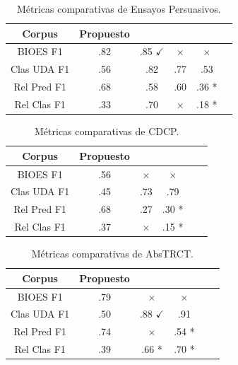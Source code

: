 \begin{table}[h!]
	\begin{center}
		\begin{tabular}{|c|c|c|c|c|c|} \hline
		Corpus		            & Propuesto  & \cite{stab2017parsing} & \cite{niculae2017argument} & \cite{galassi2021deep} \\ \hline
		BIOES F1 				& .82   	 & .85 $\checkmark$		  & $\times$        	       & $\times$				\\ \hline
		Clas UDA F1		        & .56	     & .82        			  & .77	    			       & .53					\\ \hline
		Rel Pred F1 			& .68   	 & .58        			  & .60			    	       & .36 *				   	\\ \hline
		Rel Clas F1 			& .33   	 & .70        			  & $\times$	    	       & .18 *				   	\\ \hline
		\end{tabular}
	\caption{Métricas comparativas de Ensayos Persuasivos.}\label{table:comparative_test_essays_f1_metrics_segmenter}
	\end{center}
\end{table}
\begin{table}[h!]
	\begin{center}
		\begin{tabular}{|c|c|c|c|c|c|} \hline
		Corpus		            & Propuesto  & \cite{niculae2017argument} & \cite{galassi2021deep}  \\ \hline
		BIOES F1 				& .56  	 	 & $\times$        	       	  & $\times$				\\ \hline
		Clas UDA F1		        & .45	     & .73 				 		  & .79					   	\\ \hline
		Rel Pred F1				& .68   	 & .27			    	      & .30	*			   	    \\ \hline
		Rel Clas F1				& .37   	 & $\times$	    	          & .15	*			   	    \\ \hline
		\end{tabular}
	\caption{Métricas comparativas de CDCP.}\label{table:comparative_test_cdcp_f1_metrics_segmenter}
	\end{center}
\end{table}
\begin{table}[h!]
	\begin{center}
		\begin{tabular}{|c|c|c|c|c|c|} \hline
		Corpus		            & Propuesto  & \cite{mayer2020transformer} & \cite{galassi2021deep} \\ \hline
		BIOES F1 				& .79   	 & $\times$   				   & $\times$				\\ \hline
		Clas UDA F1		        & .50	     & .88	$\checkmark$		   & .91					\\ \hline
		Rel Pred F1 			& .74   	 & $\times$	   				   & .54 *				   	\\ \hline
		Rel Clas F1 			& .39   	 & .66  *	   				   & .70 *				   	\\ \hline
		\end{tabular}
	\caption{Métricas comparativas de AbsTRCT.}\label{table:comparative_test_abstrct_f1_metrics_segmenter}
	\end{center}
\end{table}

